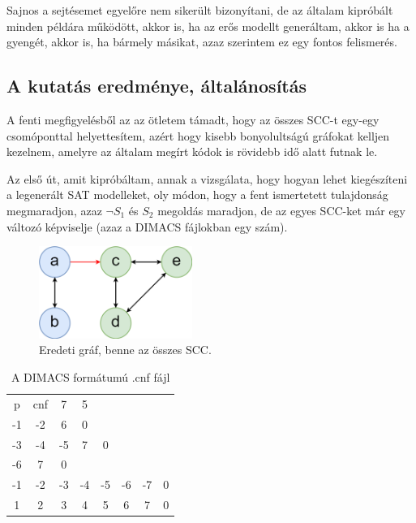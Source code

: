 \documentclass[
]{thesis-ekf}
\theoremstyle{definition}
\theoremstyle{remark}
\begin{document}
	Sajnos a sejtésemet egyelőre nem sikerült bizonyítani, de az általam kipróbált minden példára működött, akkor is, ha az erős modellt generáltam, akkor is ha a gyengét, akkor is, ha bármely másikat, azaz szerintem ez egy fontos felismerés.
	
		\subsection{A kutatás eredménye, általánosítás}

	A fenti megfigyelésből az az ötletem támadt, hogy az összes \textsc{SCC}-t egy-egy csomóponttal helyettesítem, azért hogy kisebb bonyolultságú gráfokat kelljen kezelnem, amelyre az általam megírt kódok is rövidebb idő alatt futnak le.

	Az első út, amit kipróbáltam, annak a vizsgálata, hogy hogyan lehet kiegészíteni a legenerált \textsc{SAT} modelleket, oly módon, hogy a fent ismertetett tulajdonság megmaradjon, azaz $\neg S_1$ és $ S_2 $ megoldás maradjon, de az egyes \textsc{SCC}-ket már egy változó képviselje (azaz a \textsc{DIMACS} fájlokban egy szám).
	\begin{figure}[!ht]
		\centering
		\includegraphics[width=5cm]{images/sajat_pelda_5node_9edge}
		\caption{Eredeti gráf, benne az összes \textsc{SCC}.}
		\label{abra-sajatpelda-eredeti-5-9graf}
	\end{figure}

	\begin{table}[h!]
		\centering
		\begin{tabular}{cccccccc}
		p & cnf & 7 & 5 & & & &  \\
		-1&-2& 6& 0&  &  &  &  \\
		-3&-4&-5& 7& 0&  &  &  \\
		-6& 7& 0&  &  &  &  &  \\
		-1&-2&-3&-4&-5&-6&-7& 0 \\
		1& 2& 3& 4& 5& 6& 7& 0 \\
		\end{tabular}
		\caption{\label{table-esm-cnf}A \textsc{DIMACS} formátumú .cnf fájl}
	\end{table}
	
\end{document}
